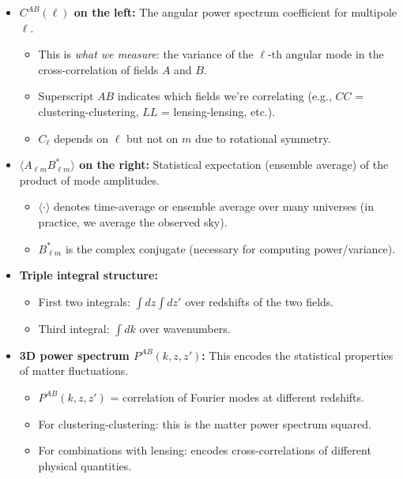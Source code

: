\begin{itemize}[leftmargin=1.5cm]
    \item \textbf{$C^{AB}(\ell)$ on the left:} The angular power spectrum coefficient for multipole $\ell$.
        \begin{itemize}
            \item This is \emph{what we measure}: the variance of the $\ell$-th angular mode in the cross-correlation of fields $A$ and $B$.
            \item Superscript $AB$ indicates which fields we're correlating (e.g., $CC$ = clustering-clustering, $LL$ = lensing-lensing, etc.).
            \item  $C_\ell$ depends on $\ell$ but not on $m$ due to rotational symmetry.
        \end{itemize}
    
    \item \textbf{$\langle A_{\ell m} B^*_{\ell m} \rangle$ on the right:} Statistical expectation (ensemble average) of the product of mode amplitudes.
        \begin{itemize}
            \item $\langle \cdot \rangle$ denotes time-average or ensemble average over many universes (in practice, we average the observed sky).
            \item $B^*_{\ell m}$ is the complex conjugate (necessary for computing power/variance).
        \end{itemize}
    
    \item \textbf{Triple integral structure:}
        \begin{itemize}
            \item First two integrals: $\int dz \int dz'$ over redshifts of the two fields.
            \item Third integral: $\int dk$ over wavenumbers.
        \end{itemize}
    
    \item \textbf{3D power spectrum $P^{AB}(k, z, z')$:} This encodes the statistical properties of matter fluctuations.
        \begin{itemize}
            \item $P^{AB}(k, z, z')$ = correlation of Fourier modes at different redshifts.
            \item For clustering-clustering: this is the matter power spectrum squared.
            \item For combinations with lensing: encodes cross-correlations of different physical quantities.
        \end{itemize}
    

\end{itemize}
